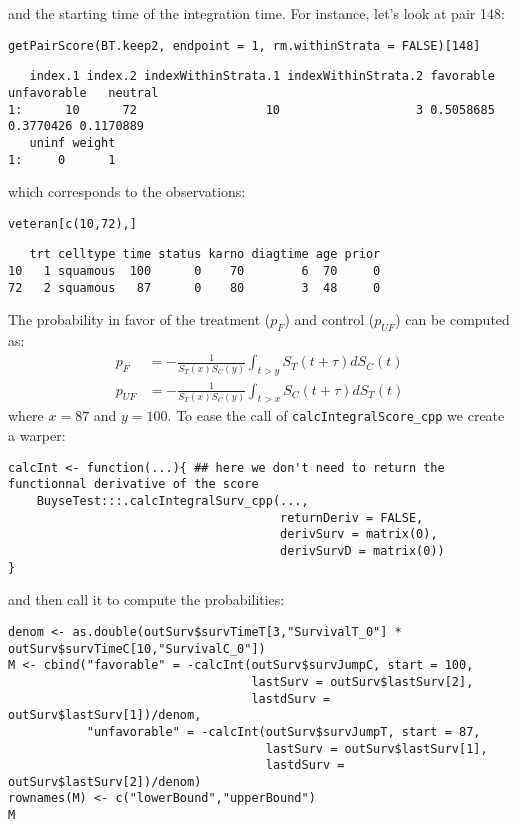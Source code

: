 \documentclass[12pt]{article}
\begin{document}
and the starting time of the integration time. For instance, let's
look at pair 148:
\lstset{language=r,label= ,caption= ,captionpos=b,numbers=none}
\begin{lstlisting}
getPairScore(BT.keep2, endpoint = 1, rm.withinStrata = FALSE)[148]
\end{lstlisting}

\begin{verbatim}
   index.1 index.2 indexWithinStrata.1 indexWithinStrata.2 favorable unfavorable   neutral
1:      10      72                  10                   3 0.5058685   0.3770426 0.1170889
   uninf weight
1:     0      1
\end{verbatim}

which corresponds to the observations:
\lstset{language=r,label= ,caption= ,captionpos=b,numbers=none}
\begin{lstlisting}
veteran[c(10,72),]
\end{lstlisting}

\begin{verbatim}
   trt celltype time status karno diagtime age prior
10   1 squamous  100      0    70        6  70     0
72   2 squamous   87      0    80        3  48     0
\end{verbatim}

The probability in favor of the treatment (\(p_F\)) and control (\(p_{UF}\)) can be computed
as:
\begin{align*}
p_F &= -\frac{1}{S_T(x)S_C(y)}\int_{t>y} S_T(t+\tau) dS_C(t) \\
p_{UF} &= -\frac{1}{S_T(x)S_C(y)}\int_{t>x} S_C(t+\tau) dS_T(t)
\end{align*}
where \(x=87\) and \(y=100\). To ease the call of \texttt{calcIntegralScore\_cpp} we create a warper:
\lstset{language=r,label= ,caption= ,captionpos=b,numbers=none}
\begin{lstlisting}
calcInt <- function(...){ ## here we don't need to return the functionnal derivative of the score 
	BuyseTest:::.calcIntegralSurv_cpp(..., 
									  returnDeriv = FALSE, 
									  derivSurv = matrix(0), 
									  derivSurvD = matrix(0))
}
\end{lstlisting}

and then call it to compute the probabilities:
\lstset{language=r,label= ,caption= ,captionpos=b,numbers=none}
\begin{lstlisting}
denom <- as.double(outSurv$survTimeT[3,"SurvivalT_0"] * outSurv$survTimeC[10,"SurvivalC_0"])
M <- cbind("favorable" = -calcInt(outSurv$survJumpC, start = 100, 
								  lastSurv = outSurv$lastSurv[2],
								  lastdSurv = outSurv$lastSurv[1])/denom,
		   "unfavorable" = -calcInt(outSurv$survJumpT, start = 87, 
									lastSurv = outSurv$lastSurv[1],
									lastdSurv = outSurv$lastSurv[2])/denom)
rownames(M) <- c("lowerBound","upperBound")
M
\end{lstlisting}
\end{document}
